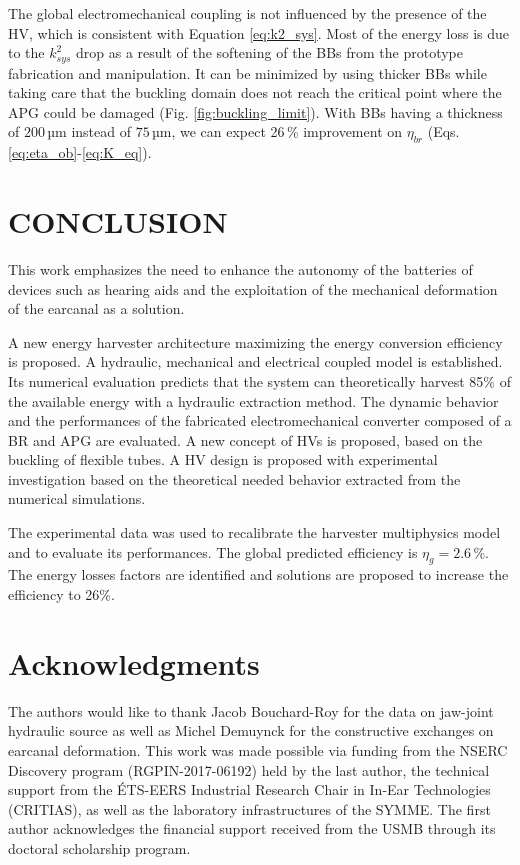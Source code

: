 \documentclass[3p,twocolumn,preprint]{elsarticle}
\begin{document}
The global electromechanical coupling is not influenced by the presence of the HV, which is consistent with Equation \ref{eq:k2_sys}. Most of the energy loss is due to the $k^2_{sys}$ drop as a result of the softening of the BBs from the prototype fabrication and manipulation. It can be minimized by using thicker BBs while taking care that the buckling domain does not reach the critical point where the APG could be damaged (Fig. \ref{fig:buckling_limit}). With BBs having a thickness of $200$\,µm instead of $75$\,µm, we can expect 26\,\% improvement on $\eta_{br}$ (Eqs. \ref{eq:eta_ob}-\ref{eq:K_eq}).
\section{CONCLUSION}
\label{sec:CONCLUSION}
This work emphasizes the need to enhance the autonomy of the batteries of devices such as hearing aids and the exploitation of the mechanical deformation of the earcanal as a solution.

A new energy harvester architecture maximizing the energy conversion efficiency is proposed. A hydraulic, mechanical and electrical coupled model is established. Its numerical evaluation predicts that the system can theoretically harvest 85\% of the available energy with a hydraulic extraction method. The dynamic behavior and the performances of the fabricated electromechanical converter composed of a BR and APG are evaluated. A new concept of HVs is proposed, based on the buckling of flexible tubes. A HV design is proposed with experimental investigation based on the theoretical needed behavior extracted from the numerical simulations.

The experimental data was used to recalibrate the harvester multiphysics model and to evaluate its performances. The global predicted efficiency is $\eta_g=2.6\,\%$. The energy losses factors are identified and solutions are proposed to increase the efficiency to 26\%.

\section{Acknowledgments}
The authors would like to thank Jacob Bouchard-Roy for the data on jaw-joint hydraulic source as well as Michel Demuynck for the constructive exchanges on earcanal deformation. This work was made possible via funding from the NSERC Discovery program (RGPIN-2017-06192) held by the last author, the technical support from the ÉTS-EERS Industrial Research Chair in In-Ear Technologies (CRITIAS), as well as the laboratory infrastructures of the SYMME. The first author acknowledges the financial support received from the USMB through its doctoral scholarship program. 
\end{document}
